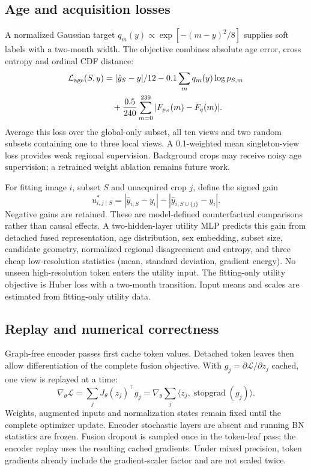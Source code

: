 \documentclass[nolineno]{ieeeaccess}
\newcommand{\sg}{\operatorname{stopgrad}}
\begin{document}
\subsection{Age and acquisition losses}
A normalized Gaussian target $q_m(y)\propto\exp[-(m-y)^2/8]$ supplies soft labels with a two-month width. The objective combines absolute age error, cross entropy and ordinal CDF distance:
\begin{equation}
\begin{split}
\mathcal L_{\rm age}(S,y)&=|\hat y_S-y|/12
-0.1\sum_m q_m(y)\log p_{S,m}\\
&\quad+\frac{0.5}{240}\sum_{m=0}^{239}|F_{p_S}(m)-F_q(m)|.
\end{split}
\end{equation}
Average this loss over the global-only subset, all ten views and two random subsets containing one to three local views. A 0.1-weighted mean singleton-view loss provides weak regional supervision. Background crops may receive noisy age supervision; a retrained weight ablation remains future work.

For fitting image $i$, subset $S$ and unacquired crop $j$, define the signed gain
\begin{equation}
u^*_{i,j\mid S}=|\hat y_{i,S}-y_i|-|\hat y_{i,S\cup\{j\}}-y_i|.
\end{equation}
Negative gains are retained. These are model-defined counterfactual comparisons rather than causal effects. A two-hidden-layer utility MLP predicts this gain from detached fused representation, age distribution, sex embedding, subset size, candidate geometry, normalized regional disagreement and entropy, and three cheap low-resolution statistics (mean, standard deviation, gradient energy). No unseen high-resolution token enters the utility input. The fitting-only utility objective is Huber loss with a two-month transition. Input means and scales are estimated from fitting-only utility data.

\subsection{Replay and numerical correctness}
Graph-free encoder passes first cache token values. Detached token leaves then allow differentiation of the complete fusion objective. With $g_j=\partial\mathcal L/\partial z_j$ cached, one view is replayed at a time:
\begin{equation}
\nabla_\theta\mathcal L
=\sum_j J_\theta(z_j)^\top g_j
=\nabla_\theta\sum_j\langle z_j,\sg(g_j)\rangle.
\end{equation}
Weights, augmented inputs and normalization states remain fixed until the complete optimizer update. Encoder stochastic layers are absent and running BN statistics are frozen. Fusion dropout is sampled once in the token-leaf pass; the encoder replay uses the resulting cached gradients. Under mixed precision, token gradients already include the gradient-scaler factor and are not scaled twice.
\end{document}
